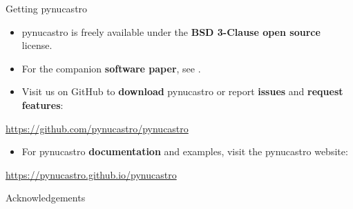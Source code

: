 \documentclass[final]{beamer}
\newlength{\onecolwid}
\begin{document}
\begin{frame}[t]
\begin{columns}[t]
\begin{column}{\onecolwid} %


  
\begin{block}{Getting pynucastro}

\begin{itemize}
\item pynucastro is freely available under the \textbf{BSD 3-Clause open source} license.
\item For the companion \textbf{software paper}, see \cite{pynucastro.joss.2018}.
\item Visit us on GitHub to \textbf{download} pynucastro or report \textbf{issues} and \textbf{request features}:
\end{itemize}

\url{https://github.com/pynucastro/pynucastro}

\begin{itemize}
\item For pynucastro \textbf{documentation} and examples, visit the pynucastro website:
\end{itemize}

\url{https://pynucastro.github.io/pynucastro}

\end{block}



\begin{block}{Acknowledgements}

\small{}

\end{block}


\end{column}
\end{columns}
\end{frame}
\end{document}
